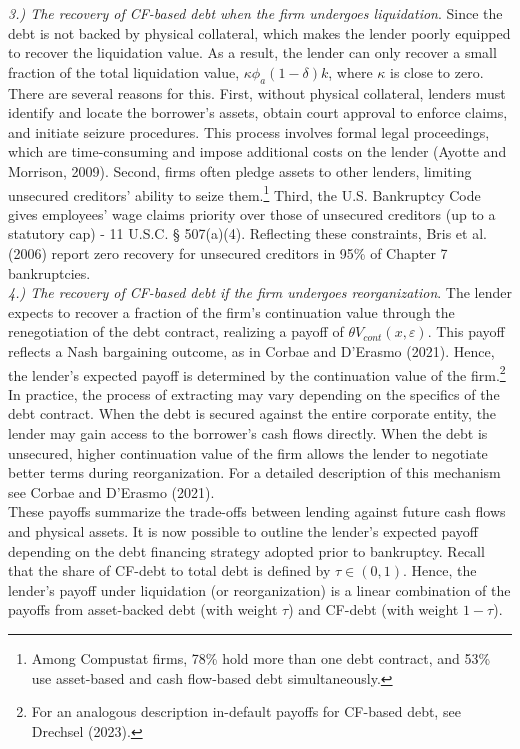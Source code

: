 \documentclass[12pt]{article}
\begin{document}
\textit{ 3.) The recovery of CF-based debt when the firm undergoes liquidation}. Since the debt is not backed by physical collateral, which makes the lender poorly equipped to recover the liquidation value. As a result, the lender can only recover a small fraction of the total liquidation value, $\kappa \phi_a(1-\delta)k$, where $\kappa$ is close to zero. There are several reasons for this. First, without physical collateral, lenders must identify and locate the borrower’s assets, obtain court approval to enforce claims, and initiate seizure procedures. This process involves formal legal proceedings, which are time-consuming and impose additional costs on the lender (Ayotte and Morrison, 2009). Second, firms often pledge assets to other lenders, limiting unsecured creditors’ ability to seize them.\footnote{Among Compustat firms, 78\% hold more than one debt contract, and 53\% use asset-based and cash flow-based debt simultaneously.} Third, the U.S. Bankruptcy Code gives employees’ wage claims priority over those of unsecured creditors (up to a statutory cap) - 11 U.S.C. § 507(a)(4). Reflecting these constraints, Bris et al. (2006) report zero recovery for unsecured creditors in 95\% of Chapter 7 bankruptcies. \vspace{3mm} \\
\textit{ 4.) The recovery of CF-based debt if the firm undergoes reorganization}. The lender expects to recover a fraction of the firm’s continuation value through the renegotiation of the debt contract, realizing a payoff of $\theta V_{cont}(x,\varepsilon)$. This payoff reflects a Nash bargaining outcome, as in Corbae and D'Erasmo (2021). Hence, the lender's expected payoff is determined by the continuation value of the firm.\footnote{For an analogous description in-default payoffs for CF-based debt, see Drechsel (2023).} In practice, the process of extracting may vary depending on the specifics of the debt contract. When the debt is secured against the entire corporate entity, the lender may gain access to the borrower's cash flows directly. When the debt is unsecured, higher continuation value of the firm allows the lender to negotiate better terms during reorganization. For a detailed description of this mechanism see Corbae and D'Erasmo (2021). \vspace{3mm} \\
These payoffs summarize the trade-offs between lending against future cash flows and physical assets. It is now possible to outline the lender's expected payoff depending on the debt financing strategy adopted prior to bankruptcy. Recall that the share of CF-debt to total debt is defined by $\tau \in (0,1)$. Hence, the lender's payoff under liquidation (or reorganization) is a linear combination of the payoffs from asset-backed debt (with weight $\tau$) and CF-debt (with weight $1-\tau$). 
\end{document}
